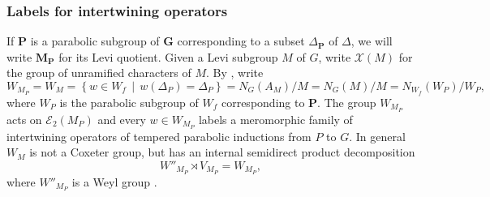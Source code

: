 \documentclass[10pt]{article}
\newcommand{\sets}[2]{\left\{#1\,\middle|\,#2\right\}}
\newcommand{\X}{\mathcal{X}}
\newcommand{\Ee}{\mathcal{E}}
\newcommand{\G}{\mathbf{G}}
\theoremstyle{definition}
\theoremstyle{remark}
\begin{document}
\subsubsection{Labels for intertwining operators}
\label{subsection labels for intertwining operators}
If $\mathbf{P}$ is a parabolic subgroup of $\G$ corresponding to a subset $\Delta_{\mathbf{P}}$ of 
$\Delta$, we will write $\mathbf{M}_\mathbf{P}$ for its Levi quotient. Given a Levi subgroup $M$ of $G$,
write $\X(M)$ for the group of unramified characters of $M$. By \cite[Cor. 3]{Howlett}, write
%
\[
W_{M_P}=W_M=\sets{w\in W_f}{w(\Delta_P)=\Delta_P}=N_G(A_{M})/M=N_G(M)/M=N_{W_f}(W_P)/W_P,
\]
%
where $W_P$ is the parabolic subgroup of $W_f$ corresponding to $\mathbf{P}$. 
The group $W_{M_P}$ acts on $\Ee_2(M_P)$ and every $w\in W_{M_P}$ labels a meromorphic family of 
intertwining operators of tempered parabolic inductions from $P$ to $G$. 
In general $W_M$ is not a Coxeter group, but has an internal semidirect product decomposition 
\cite[Cor. 7]{Howlett}
%
\[
W''_{M_P}\rtimes V_{M_P}=W_{M_P},
\]
%
where $W''_{M_P}$ is a Weyl group \cite[Thm. 6]{Howlett}. 
%
\end{document}

